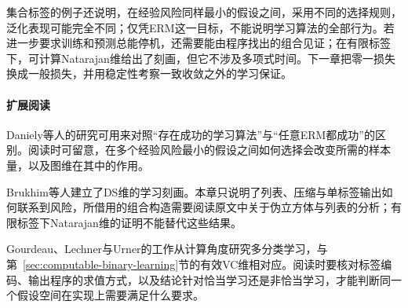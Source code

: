 集合标签的例子还说明，在经验风险同样最小的假设之间，采用不同的选择规则，泛化表现可能完全不同；仅凭ERM这一目标，不能说明学习算法的全部行为。若进一步要求训练和预测总能停机，还需要能由程序找出的组合见证；在有限标签下，可计算Natarajan维给出了刻画，但它不涉及多项式时间。下一章把零一损失换成一般损失，并用稳定性考察一致收敛之外的学习保证。

\paragraph{扩展阅读}
Daniely等人的研究可用来对照“存在成功的学习算法”与“任意ERM都成功”的区别。阅读时可留意，在多个经验风险最小的假设之间如何选择会改变所需的样本量，以及图维在其中的作用。

Brukhim等人建立了DS维的学习刻画。本章只说明了列表、压缩与单标签输出如何联系到风险，所借用的组合构造需要阅读原文中关于伪立方体与列表的分析；有限标签下Natarajan维的证明不能替代这些结果。

Gourdeau、Lechner与Urner的工作从计算角度研究多分类学习，与第~\ref{sec:computable-binary-learning}节的有效VC维相对应。阅读时要核对标签编码、输出程序的求值方式，以及结论针对恰当学习还是非恰当学习，才能判断同一个假设空间在实现上需要满足什么要求。
